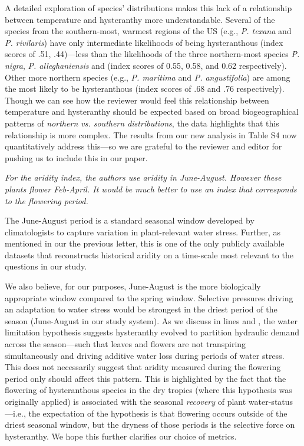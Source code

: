 \documentclass{article}[12pt]
\begin{document}
A detailed exploration of species' distributions makes this lack of a relationship between temperature and hysteranthy more understandable. %
Several of the species from the southern-most, warmest regions of the US (e.g., \emph{P. texana} and \emph{P. rivilaris}) have only intermediate likelihoods of being hysteranthous (index scores of .51, .44)---less than the likelihoods of the three northern-most species \emph{P. nigra}, \emph{P. alleghaniensis} and  (index scores of 0.55, 0.58, and 0.62 respectively). Other more northern species (e.g., \emph{P. maritima} and \emph{P. angustifolia}) are among the most likely to be hysteranthous (index scores of .68 and .76 respectively). Though we can see how the reviewer would feel this relationship between temperature and hysteranthy should be expected based on broad biogeographical patterns of \emph{northern vs. southern distributions}, the data highlights that this relationship is more complex. The results from our new analysis in Table S4 now quantitatively address this---so we are grateful to the reviewer and editor for pushing us to include this in our paper.

\emph{For the aridity index, the authors use aridity in June-August. However these plants flower Feb-April. It would be much better to use an index that corresponds to the flowering period.}

The June-August period is a standard seasonal window developed by climatologists to capture variation in plant-relevant water stress. Further, as mentioned in our the previous letter, this is one of the only publicly available datasets that reconstructs historical aridity on a time-scale most relevant to the questions in our study.

We also believe, for our purposes, June-August is the more biologically appropriate window compared to the spring window. Selective pressures driving an adaptation to water stress would be strongest in the driest period of the season (June-August in our study system). As we discuss in lines  and , the water limitation hypothesis suggests hysteranthy evolved to partition hydraulic demand across the season---such that leaves and flowers are not transpiring simultaneously and driving additive water loss during periods of water stress. This does not necessarily suggest that aridity measured during the flowering period only should affect this pattern. This is highlighted by the fact that the flowering of hysteranthous species in the dry tropics (where this hypothesis was originally applied) is associated with the seasonal \emph{recovery} of plant water-status \citep{Franklin2016}---i.e., the expectation of the hypothesis is that flowering occurs outside of the driest seasonal window, but the dryness of those periods is the selective force on hysteranthy. We hope this further clarifies our choice of metrics. 
\end{document}
